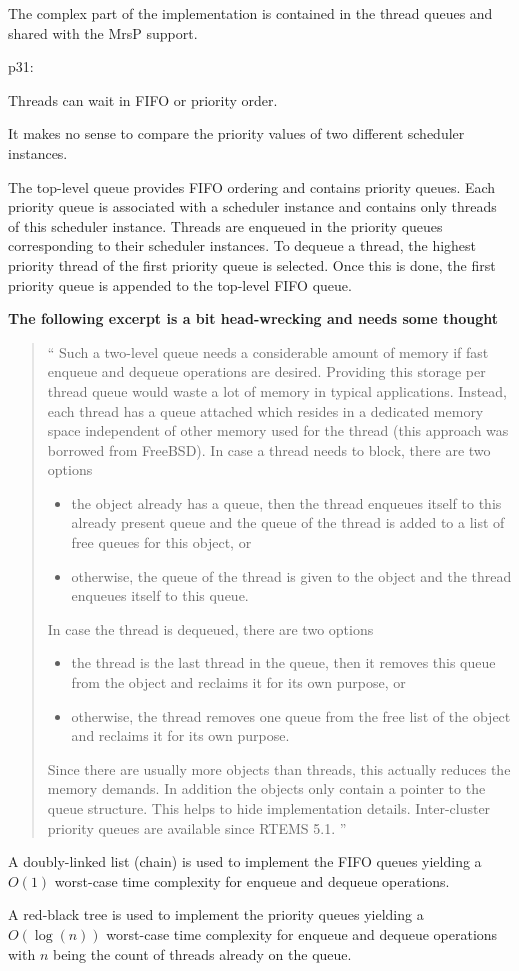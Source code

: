 The complex part of the implementation is contained in the thread
queues and shared with the MrsP support.

p31:

Threads can wait in FIFO or priority order.

It makes
no sense to compare the priority values of two different scheduler instances.

The top-level queue provides FIFO ordering
and contains priority queues.
Each priority queue is associated with a scheduler instance and
contains only threads of this scheduler instance.
Threads are enqueued in the priority queues
corresponding to their scheduler instances.
To dequeue a thread, the highest priority thread of
the first priority queue is selected.
Once this is done, the first priority queue is appended to the
top-level FIFO queue.

\textbf{The following excerpt is a bit head-wrecking and needs some thought}

\begin{quote}
``
Such a two-level queue needs a considerable amount of memory
if fast enqueue and dequeue
operations are desired.
Providing this storage per thread queue would waste a lot of memory
in typical applications.
Instead, each thread has a queue attached which resides in a dedicated
memory space independent of other memory
used for the thread (this approach was borrowed
from FreeBSD).
In case a thread needs to block, there are two options
\begin{itemize}
  \item
    the object already has a queue,
    then the thread enqueues itself to this already present queue
    and the queue of the thread is added to
    a list of free queues for this object, or
  \item
    otherwise,
    the queue of the thread is given to the object
    and the thread enqueues itself to this queue.
\end{itemize}
In case the thread is dequeued, there are two options
\begin{itemize}
  \item
    the thread is the last thread in the queue,
    then it removes this queue from the object and
    reclaims it for its own purpose, or
  \item
    otherwise,
    the thread removes one queue from the free list of the object
    and reclaims it for its own purpose.
\end{itemize}
Since there are usually more objects than threads, this actually reduces the memory demands.
In addition the objects only contain a pointer to the queue structure. This helps to hide implementation
details. Inter-cluster priority queues are available since RTEMS 5.1.
''
\end{quote}

A doubly-linked list (chain) is used to implement the FIFO queues
yielding a $O(1)$ worst-case
time complexity for enqueue and dequeue operations.

A red-black tree is used to implement the priority queues
yielding a $O(\log(n))$ worst-case time
complexity for enqueue and dequeue operations
with $n$ being the count of threads already on
the queue.
